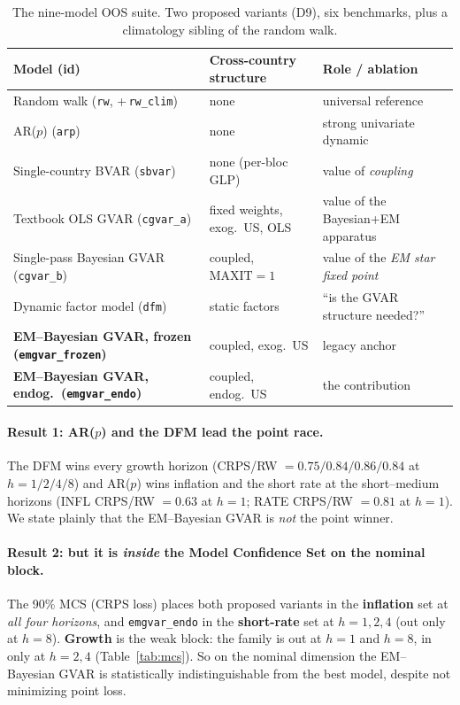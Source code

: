 \documentclass[11pt]{article}
\begin{document}
\begin{table}[t]
\centering
\caption{The nine-model OOS suite. Two proposed variants (D9), six benchmarks, plus a climatology
sibling of the random walk.}
\label{tab:bench}
\begin{tabular}{@{}lll@{}}
\toprule
Model (id) & Cross-country structure & Role / ablation \\
\midrule
Random walk (\texttt{rw}, +\,\texttt{rw\_clim})   & none                       & universal reference \\
AR($p$) (\texttt{arp})                            & none                       & strong univariate dynamic \\
Single-country BVAR (\texttt{sbvar})              & none (per-bloc GLP)        & value of \emph{coupling} \\
Textbook OLS GVAR (\texttt{cgvar\_a})             & fixed weights, exog.\ US, OLS & value of the Bayesian+EM apparatus \\
Single-pass Bayesian GVAR (\texttt{cgvar\_b})     & coupled, $\text{MAXIT}=1$  & value of the \emph{EM star fixed point} \\
Dynamic factor model (\texttt{dfm})               & static factors             & ``is the GVAR structure needed?'' \\
\textbf{EM--Bayesian GVAR, frozen (\texttt{emgvar\_frozen})} & coupled, exog.\ US & legacy anchor \\
\textbf{EM--Bayesian GVAR, endog.\ (\texttt{emgvar\_endo})}  & coupled, endog.\ US & the contribution \\
\bottomrule
\end{tabular}
\end{table}

\paragraph{Result 1: AR($p$) and the DFM lead the point race.} The DFM wins every growth horizon
(CRPS/RW $=0.75/0.84/0.86/0.84$ at $h=1/2/4/8$) and AR($p$) wins inflation and the short rate at the
short--medium horizons (INFL CRPS/RW $=0.63$ at $h{=}1$; RATE CRPS/RW $=0.81$ at $h{=}1$). We state
plainly that the EM--Bayesian GVAR is \emph{not} the point winner.

\paragraph{Result 2: but it is \emph{inside} the Model Confidence Set on the nominal block.}
The 90\% MCS (CRPS loss) places both proposed variants in the \textbf{inflation} set at \emph{all four
horizons}, and \texttt{emgvar\_endo} in the \textbf{short-rate} set at $h=1,2,4$ (out only at $h{=}8$).
\textbf{Growth} is the weak block: the family is out at $h{=}1$ and $h{=}8$, in only at $h=2,4$
(Table~\ref{tab:mcs}). So on the nominal dimension the EM--Bayesian GVAR is statistically
indistinguishable from the best model, despite not minimizing point loss.
\end{document}
